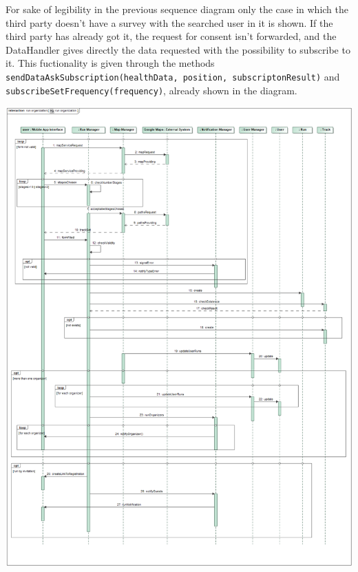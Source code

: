 For sake of legibility in the previous sequence diagram only the case in which the third party doesn't have a survey with the searched user in it is shown. If the third party has already got it, the request for consent isn't forwarded, and the DataHandler gives directly the data requested with the possibility to subscribe to it. This fuctionality is given through the methods \texttt{sendDataAskSubscription(healthData, position, subscriptonResult)} and \texttt{subscribeSetF\-requency(frequency)}, already shown in the diagram.

\begin{center}
\includegraphics[scale=0.35]{sections/diagrams/run_organization}
\newline
{}
\end{center}


